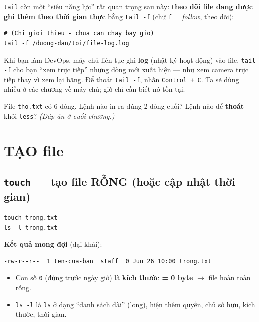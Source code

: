\documentclass[12pt,a4paper]{article}
\newcommand{\cmd}[1]{\texttt{#1}}
\begin{document}
\cmd{tail} còn một ``siêu năng lực'' rất quan trọng sau này: \textbf{theo dõi file đang được ghi thêm theo thời gian thực} bằng \cmd{tail -f} (chữ \cmd{f} = \textit{follow}, theo dõi):

\begin{Verbatim}
# (Chi gioi thieu - chua can chay bay gio)
tail -f /duong-dan/toi/file-log.log
\end{Verbatim}

\begin{notebox}[title={Mẹo: Vì sao quan trọng?}]
Khi bạn làm DevOps, máy chủ liên tục ghi \textbf{log} (nhật ký hoạt động) vào file. \cmd{tail -f} cho bạn ``xem trực tiếp'' những dòng mới xuất hiện --- như xem camera trực tiếp thay vì xem lại băng. Để thoát \cmd{tail -f}, nhấn \cmd{Control + C}. Ta sẽ dùng nhiều ở các chương về máy chủ; giờ chỉ cần biết nó tồn tại.
\end{notebox}

\begin{checkbox}[title={Tự kiểm tra 1}]
File \cmd{tho.txt} có 6 dòng. Lệnh nào in ra đúng 2 dòng cuối? Lệnh nào để \textbf{thoát} khỏi \cmd{less}? \textit{(Đáp án ở cuối chương.)}
\end{checkbox}

\section{TẠO file}

\subsection{\texttt{touch} --- tạo file RỖNG (hoặc cập nhật thời gian)}

\begin{Verbatim}
touch trong.txt
ls -l trong.txt
\end{Verbatim}

\textbf{Kết quả mong đợi} (đại khái):
\begin{Verbatim}
-rw-r--r--  1 ten-cua-ban  staff  0 Jun 26 10:00 trong.txt
\end{Verbatim}

\begin{itemize}[leftmargin=1.4em]
\item Con số \cmd{0} (đứng trước ngày giờ) là \textbf{kích thước = 0 byte} $\rightarrow$ file hoàn toàn rỗng.
\item \cmd{ls -l} là \cmd{ls} ở dạng ``danh sách dài'' (long), hiện thêm quyền, chủ sở hữu, kích thước, thời gian.
\end{itemize}
\end{document}
